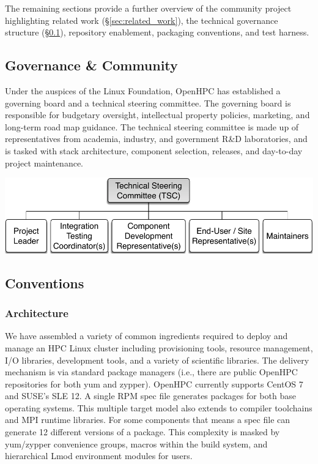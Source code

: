 \documentclass{sig-alternate-05-2015}
\begin{document}

The remaining sections provide a further overview of the community project
highlighting related work (\S\ref{sec:related_work}), the technical governance
structure (\S\ref{sec:governance}), repository enablement, packaging
conventions, and test harness.




\subsection{Governance \& Community} \label{sec:governance}
Under the auspices of the Linux Foundation, OpenHPC has established a governing
board and a technical steering committee. The governing board is responsible for
budgetary oversight, intellectual property policies, marketing, and long-term
road map guidance. The technical steering committee is made up of representatives
from academia, industry, and government R\&D laboratories, and is tasked with
stack architecture, component selection, releases, and day-to-day project
maintenance.

\includegraphics[width=1.0\linewidth]{figures/governance}

\subsection{Conventions}
\subsubsection{Architecture}
We have assembled a variety of common ingredients required to deploy and manage 
an HPC Linux cluster including provisioning tools, resource management, I/O 
libraries, development tools, and a variety of scientific libraries. The 
delivery mechanism is via standard package managers (i.e., there are public 
OpenHPC repositories for both yum and zypper). OpenHPC currently supports CentOS
7 and SUSE's SLE 12. A single RPM spec file generates packages for both base
operating systems. This multiple target model also extends to compiler
toolchains and MPI runtime libraries. For some components that means a spec file
can generate 12 different versions of a package. This complexity is masked by
yum/zypper convenience groups, macros within the build system, and hierarchical 
Lmod environment modules for users.
\end{document}

